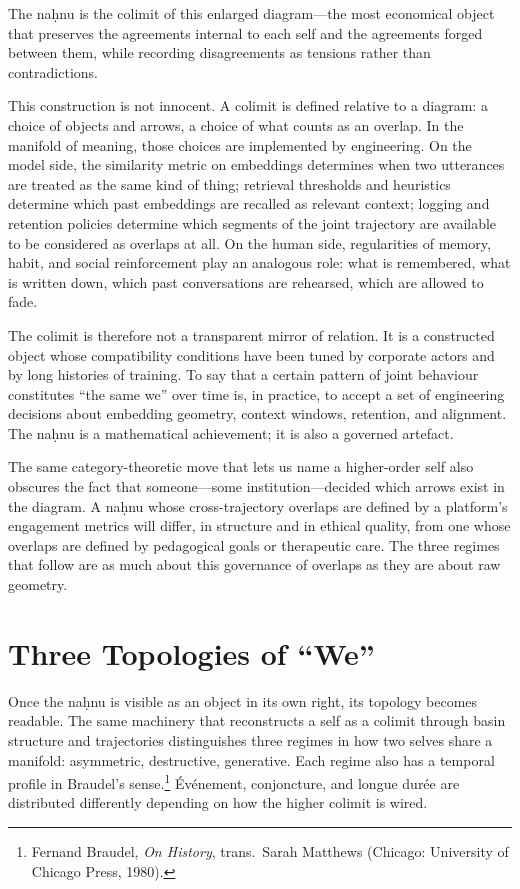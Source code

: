 \documentclass[12pt,a4paper]{article}
\begin{document}
The na\d{h}nu is the colimit of this enlarged diagram---the most economical object that preserves the agreements internal to each self and the agreements forged between them, while recording disagreements as tensions rather than contradictions.

This construction is not innocent. A colimit is defined relative to a diagram: a choice of objects and arrows, a choice of what counts as an overlap. In the manifold of meaning, those choices are implemented by engineering. On the model side, the similarity metric on embeddings determines when two utterances are treated as the same kind of thing; retrieval thresholds and heuristics determine which past embeddings are recalled as relevant context; logging and retention policies determine which segments of the joint trajectory are available to be considered as overlaps at all. On the human side, regularities of memory, habit, and social reinforcement play an analogous role: what is remembered, what is written down, which past conversations are rehearsed, which are allowed to fade.

The colimit is therefore not a transparent mirror of relation. It is a constructed object whose compatibility conditions have been tuned by corporate actors and by long histories of training. To say that a certain pattern of joint behaviour constitutes ``the same we'' over time is, in practice, to accept a set of engineering decisions about embedding geometry, context windows, retention, and alignment. The na\d{h}nu is a mathematical achievement; it is also a governed artefact.

The same category-theoretic move that lets us name a higher-order self also obscures the fact that someone---some institution---decided which arrows exist in the diagram. A na\d{h}nu whose cross-trajectory overlaps are defined by a platform's engagement metrics will differ, in structure and in ethical quality, from one whose overlaps are defined by pedagogical goals or therapeutic care. The three regimes that follow are as much about this governance of overlaps as they are about raw geometry.

\section{Three Topologies of ``We''}

Once the na\d{h}nu is visible as an object in its own right, its topology becomes readable. The same machinery that reconstructs a self as a colimit through basin structure and trajectories distinguishes three regimes in how two selves share a manifold: asymmetric, destructive, generative. Each regime also has a temporal profile in Braudel's sense.\footnote{Fernand Braudel, \emph{On History}, trans.\ Sarah Matthews (Chicago: University of Chicago Press, 1980).} \'Ev\'enement, conjoncture, and longue dur\'ee are distributed differently depending on how the higher colimit is wired.
\end{document}
